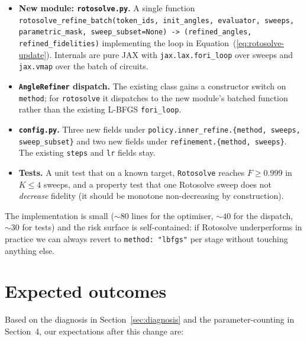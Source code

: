 \documentclass[11pt,a4paper]{article}
\begin{document}
\begin{itemize}[leftmargin=2em]
\item \textbf{New module: \texttt{rotosolve.py}.} A single function
\texttt{rotosolve\_refine\_batch(token\_ids, init\_angles, evaluator,
sweeps, parametric\_mask, sweep\_subset=None) -> (refined\_angles,
refined\_fidelities)} implementing the loop in
Equation~(\ref{eq:rotosolve-update}). Internals are pure JAX with
\texttt{jax.lax.fori\_loop} over sweeps and \texttt{jax.vmap} over the
batch of circuits.

\item \textbf{\texttt{AngleRefiner} dispatch.} The existing class gains
a constructor switch on \texttt{method}; for \texttt{rotosolve} it dispatches
to the new module's batched function rather than the existing L-BFGS
\texttt{fori\_loop}.

\item \textbf{\texttt{config.py}.} Three new fields under
\texttt{policy.inner\_refine.\{method, sweeps, sweep\_subset\}} and
two new fields under \texttt{refinement.\{method, sweeps\}}. The
existing \texttt{steps} and \texttt{lr} fields stay.

\item \textbf{Tests.} A unit test that on a known target,
\texttt{Rotosolve} reaches $F \ge 0.999$ in $K \le 4$ sweeps, and a
property test that one Rotosolve sweep does not \emph{decrease}
fidelity (it should be monotone non-decreasing by construction).
\end{itemize}

The implementation is small ($\sim 80$ lines for the optimiser, $\sim 40$
for the dispatch, $\sim 30$ for tests) and the risk surface is
self-contained: if Rotosolve underperforms in practice we can always
revert to \texttt{method: "lbfgs"} per stage without touching anything
else.

\section{Expected outcomes}

Based on the diagnosis in Section~\ref{sec:diagnosis} and the
parameter-counting in Section~4, our expectations after this change are:
\end{document}
